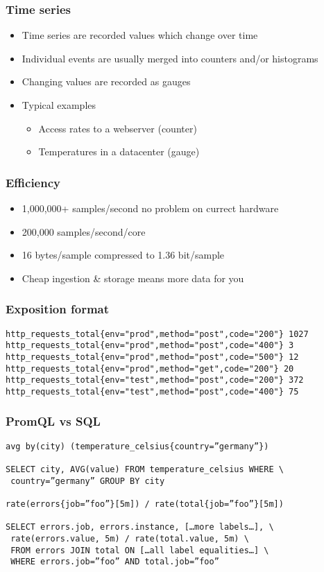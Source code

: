 \documentclass[aspectratio=169]{beamer}
\begin{document}
\begin{frame}
	\frametitle{Time series}
	\begin{itemize}
		\item Time series are recorded values which change over time
		\item Individual events are usually merged into counters and/or histograms
		\item Changing values are recorded as gauges
		\item Typical examples
		\begin{itemize}
			\item Access rates to a webserver (counter)
			\item Temperatures in a datacenter (gauge)
		\end{itemize}
	\end{itemize}
\end{frame}

\begin{frame}
	\frametitle{Efficiency}
	\begin{itemize}
		\item 1,000,000+ samples/second no problem on currect hardware
		\item 200,000 samples/second/core
		\item 16 bytes/sample compressed to 1.36 bit/sample
		\item Cheap ingestion \& storage means more data for you
	\end{itemize}
\end{frame}

\begin{frame}[fragile]
	\frametitle{Exposition format}
	\fontsize{10pt}{12}\selectfont
	\begin{verbatim}
http_requests_total{env="prod",method="post",code="200"} 1027
http_requests_total{env="prod",method="post",code="400"} 3
http_requests_total{env="prod",method="post",code="500"} 12
http_requests_total{env="prod",method="get",code="200"} 20
http_requests_total{env="test",method="post",code="200"} 372
http_requests_total{env="test",method="post",code="400"} 75
	\end{verbatim}
\end{frame}

\begin{frame}[fragile]
	\frametitle{PromQL vs SQL}
	\fontsize{10pt}{12}\selectfont
	\begin{verbatim}
avg by(city) (temperature_celsius{country=”germany”})

SELECT city, AVG(value) FROM temperature_celsius WHERE \
 country=”germany” GROUP BY city

rate(errors{job=”foo”}[5m]) / rate(total{job=”foo”}[5m])

SELECT errors.job, errors.instance, […more labels…], \
 rate(errors.value, 5m) / rate(total.value, 5m) \
 FROM errors JOIN total ON […all label equalities…] \
 WHERE errors.job=”foo” AND total.job=”foo”
	\end{verbatim}
\end{frame}
\end{document}
